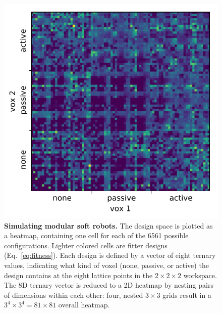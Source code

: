 
\begin{figure}[t]
    \centering
    \includegraphics[width=0.7\linewidth]{Chapter02/fig/design_space.pdf}
    \caption{\textbf{Simulating modular soft robots.}
    The design space is plotted as a heatmap, containing one cell for each of the 6561 possible configurations.
    Lighter colored cells are fitter designs (Eq.~\ref{eq:fitness}).
    Each design is defined by a vector of eight ternary values, indicating what kind of voxel (none, passive, or active) the design contains at the eight lattice points in the $2\times2\times2$ workspace.
    The 8D ternary vector is reduced to a 2D heatmap by nesting pairs of dimensions within each other: four, nested $3\times3$ grids result in a $3^4\times3^4=81\times81$ overall heatmap.
    }
    \label{fig:sim}
\end{figure}
